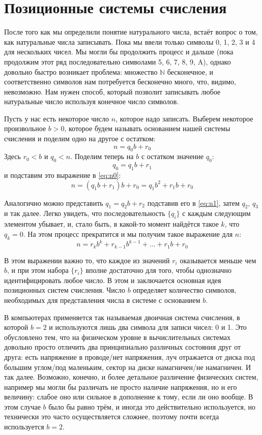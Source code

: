 \section{Позиционные системы счисления}

После того как мы определили понятие натурального числа, встаёт вопрос о том, как натуральные числа записывать. Пока мы ввели только символы 0, 1, 2, 3 и 4 для нескольких чисел. Мы могли бы продолжить процесс и дальше (пока продолжим этот ряд последовательно символами 5, 6, 7, 8, 9, A), однако довольно быстро возникает проблема: множество $\mathbb{N}$ бесконечное, и соответственно символов нам потребуется бесконечно много, что, видимо, невозможно. Нам нужен способ, который позволит записывать любое натуральные число используя конечное число символов.

Пусть у нас есть некоторое число $n$, которое надо записать. Выберем некоторое произвольное $b > 0$, которое будем называть основанием нашей системы счисления и поделим одно на другое с остатком:
\begin{equation}\label{eq:n0}
n = q_0b + r_0
\end{equation}
Здесь $r_0 < b$ и $q_0 < n$. Поделим теперь на $b$ с остатком значение $q_0$: $$q_0 = q_1b + r_1$$ и подставим это выражение в \eqref{eq:n0}:
\begin{equation}\label{eq:n1}
n = (q_1b + r_1)b + r_0 = q_1b^2 + r_1b + r_0
\end{equation}

Аналогично можно представить $q_1 = q_2b + r_2$ подставив его в \eqref{eq:n1}, затем $q_2$, $q_3$ и так далее. Легко увидеть, что последовательность $\{q_i\}$ с каждым следующим элементом убывает, и, стало быть, в какой-то момент найдётся такое $k$, что $q_k = 0$. На этом процесс прекратится и мы получим такое выражение для $n$:
\begin{equation}\label{eq:nk}
n = r_kb^k + r_{k-1}b^{k-1} +\ldots + r_1b + r_0
\end{equation}

В этом выражении важно то, что каждое из значений $r_i$ оказывается меньше чем $b$, и при этом набора $\{r_i\}$ вполне достаточно для того, чтобы однозначно идентифицировать любое число. В этом и заключается основная идея позиционных систем счисления. Число $b$ определяет количество символов, необходимых для представления числа в системе с основанием $b$.

В компьютерах применяется так называемая двоичная система счисления, в которой $b=2$ и используются лишь два символа для записи чисел: 0 и 1. Это обусловлено тем, что на физическом уровне в вычислительных системах довольно просто отличить два принципиально различных состояния друг от друга: есть напряжение в проводе/нет напряжения, луч отражается от диска под большим углом/под маленьким, сектор на диске намагничен/не намагничен. И так далее. Возможно, конечно, и более детальное различение физических систем, например мы могли бы различать не просто наличие напряжения, но и его величину: слабое оно или сильное в дополнение к тому, если ли оно вообще. В этом случае $b$ было бы равно трём, и иногда это действительно используется, но технически это часто осуществляется сложнее, поэтому почти всегда используется $b=2$.

